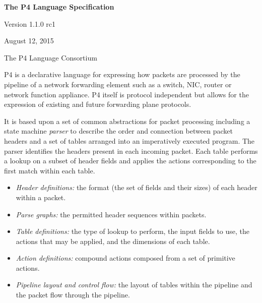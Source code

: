 \documentclass[12pt]{article}
\begin{document}
\vspace{2cm}

\centerline{\sffamily\bfseries\huge The P4 Language Specification}
\vspace{3mm}
\centerline{\sffamily\Large Version 1.1.0 rc1}
\vspace{3mm}
\centerline{\sffamily\large August 12, 2015}
\vspace{8mm}
\centerline{\sffamily\large The P4 Language Consortium}

\date{August 12, 2015}
\thispagestyle{firstpagestyle}


P4 is a declarative language for expressing how packets are processed by the 
pipeline of a network forwarding element such as a switch, NIC, router or 
network function appliance. P4 itself is protocol independent but allows for
the expression of existing and future forwarding plane protocols. 

It is based upon a set of common abstractions for packet processing including a
state machine \textit{parser} to describe the order and connection between
packet headers and a set of \matchaction tables arranged into an imperatively
executed program. The parser identifies the headers present in each incoming
packet. Each \matchaction table performs a lookup on a subset of header fields
and applies the actions corresponding to the first match within each table.

\begin{itemize}
\item
\textit{Header definitions:} the format (the set of fields and their
sizes) of each header within a packet.
\item
\textit{Parse graphs:} the permitted header sequences within packets.
\item
\textit{Table definitions:} the type of lookup to perform, the input
fields to use, the actions that may be applied, and the dimensions of
each table.
\item
\textit{Action definitions:} compound actions composed from a set of
primitive actions.
\item
\textit{Pipeline layout and control flow:} the layout of tables within
the pipeline and the packet flow through the pipeline.
\end{itemize}
\end{document}
